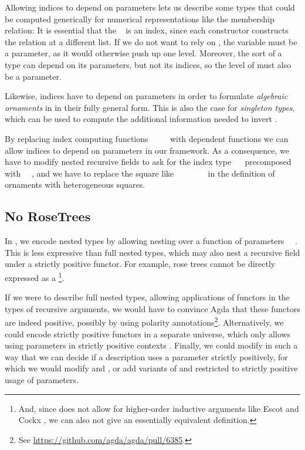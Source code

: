 Allowing indices to depend on parameters lets us describe some types that could be computed generically for numerical representations like the membership relation:
It is essential that the \  is an index, since each constructor constructs the relation at a different list. If we do not want to rely on , the variable  must be a parameter, as it would otherwise push  up one level. Moreover, the sort of a type can depend on its parameters, but not its indices, so the level of  must also be a parameter.

Likewise, indices have to depend on parameters in order to formulate \emph{algebraic ornaments} \cite{algorn} in  in their fully general form. This is also the case for \emph{singleton types}, which can be used to compute the additional information needed to invert .

By replacing index computing functions \ \AF{\&}\ \ \  with dependent functions
we can allow indices to depend on parameters in our framework. As a consequence, we have to modify nested recursive fields to ask for the index type \ \  precomposed with \ \ , and we have to replace the square like \ \ \ \ \ \ \  in the definition of ornaments with heterogeneous squares.


\subsection{No RoseTrees}
In , we encode nested types by allowing nesting over a function of parameters \ \ . This is less expressive than full nested types, which may also nest a recursive field under a strictly positive functor. For example, rose trees
cannot be directly expressed as a \footnote{And, since  does not allow for higher-order inductive arguments like Escot and Cockx \cite{practgen}, we can also not give an essentially equivalent definition.}.

If we were to describe full nested types, allowing applications of functors in the types of recursive arguments, we would have to convince Agda that these functors are indeed positive, possibly by using polarity annotations\footnote{See \url{https://github.com/agda/agda/pull/6385}.}. Alternatively, we could encode strictly positive functors in a separate universe, which only allows using parameters in strictly positive contexts \cite{sijsling}. Finally, we could modify  in such a way that we can decide if a description uses a parameter strictly positively, for which we would modify  and , or add variants of  and  restricted to strictly positive usage of parameters.



